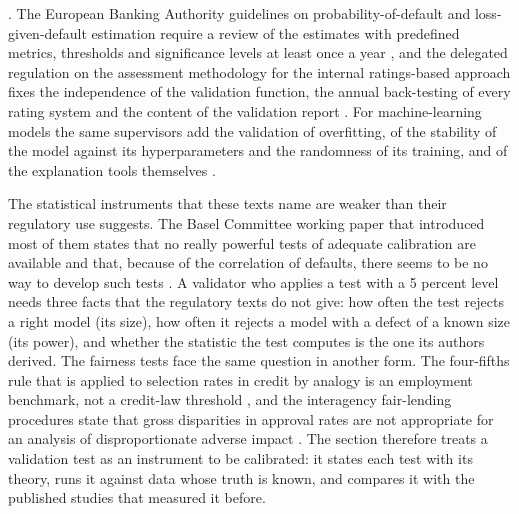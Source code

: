 \citep{credit-scoring:ecb2019}. The European Banking Authority guidelines on probability-of-default and loss-given-default
estimation require a review of the estimates with predefined metrics, thresholds and significance levels at least once a year
\citep{validation-tests:eba2018gl1716}, and the delegated regulation on the assessment methodology for the internal ratings-based approach
fixes the independence of the validation function, the annual back-testing of every rating system and the content of the validation
report \citep{validation-tests:eu2022rts439}. For machine-learning models the same supervisors add the validation of overfitting, of the
stability of the model against its hyperparameters and the randomness of its training, and of the explanation tools themselves
\citep{validation-tests:ecb2025egim,validation-tests:eba2023ml}.

The statistical instruments that these texts name are weaker than their regulatory use suggests. The Basel Committee working paper that
introduced most of them states that no really powerful tests of adequate calibration are available and that, because of the correlation
of defaults, there seems to be no way to develop such tests \citep{credit-scoring:bcbswp14}. A validator who applies a test with a
5 percent level needs three facts that the regulatory texts do not give: how often the test rejects a right model (its size), how often it
rejects a model with a defect of a known size (its power), and whether the statistic the test computes is the one its authors derived. The
fairness tests face the same question in another form. The four-fifths rule that is applied to selection rates in credit by analogy is an
employment benchmark, not a credit-law threshold \citep{validation-tests:cfr1607}, and the interagency fair-lending procedures state that
gross disparities in approval rates are not appropriate for an analysis of disproportionate adverse impact \citep{validation-tests:interagency2009}.
The section therefore treats a validation test as an instrument to be calibrated: it states each test with its theory, runs it against data
whose truth is known, and compares it with the published studies that measured it before.

